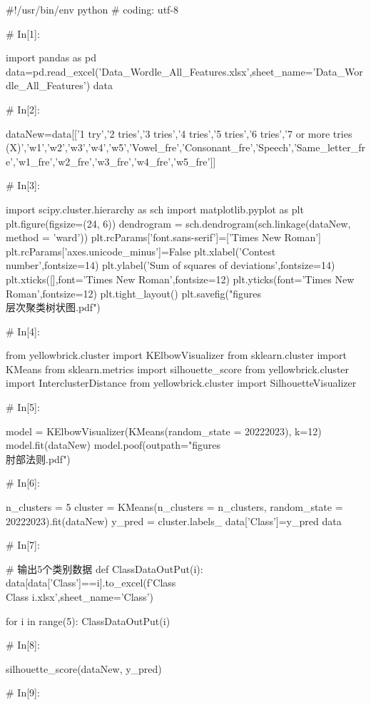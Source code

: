 \documentclass{MathModeling}
\begin{document}
\begin{python}
#!/usr/bin/env python
# coding: utf-8

# In[1]:


import pandas as pd
data=pd.read_excel('Data_Wordle_All_Features.xlsx',sheet_name='Data_Wordle_All_Features')
data


# In[2]:


dataNew=data[['1 try','2 tries','3 tries','4 tries','5 tries','6 tries','7 or more tries (X)','w1','w2','w3','w4','w5','Vowel_fre','Consonant_fre','Speech','Same_letter_fre','w1_fre','w2_fre','w3_fre','w4_fre','w5_fre']]


# In[3]:


import scipy.cluster.hierarchy as sch
import matplotlib.pyplot as plt
plt.figure(figsize=(24, 6))
dendrogram = sch.dendrogram(sch.linkage(dataNew, method = 'ward'))
plt.rcParams['font.sans-serif']=['Times New Roman']
plt.rcParams['axes.unicode_minus']=False
plt.xlabel('Contest number',fontsize=14)
plt.ylabel('Sum of squares of deviations',fontsize=14)
plt.xticks([],font='Times New Roman',fontsize=12)
plt.yticks(font='Times New Roman',fontsize=12)
plt.tight_layout()
plt.savefig("figures\\层次聚类树状图.pdf")


# In[4]:


from yellowbrick.cluster import KElbowVisualizer
from sklearn.cluster import KMeans
from sklearn.metrics import silhouette_score
from yellowbrick.cluster import InterclusterDistance
from yellowbrick.cluster import SilhouetteVisualizer


# In[5]:


model = KElbowVisualizer(KMeans(random_state = 20222023), k=12)
model.fit(dataNew)
model.poof(outpath="figures\\肘部法则.pdf")


# In[6]:


n_clusters = 5
cluster = KMeans(n_clusters = n_clusters, random_state = 20222023).fit(dataNew)
y_pred = cluster.labels_
data['Class']=y_pred
data


# In[7]:


# 输出5个类别数据
def ClassDataOutPut(i):
    data[data['Class']==i].to_excel(f'Class\\Class {i}.xlsx',sheet_name='Class')


for i in range(5):
    ClassDataOutPut(i)


# In[8]:


silhouette_score(dataNew, y_pred)


# In[9]:



\end{python}
\end{document}
